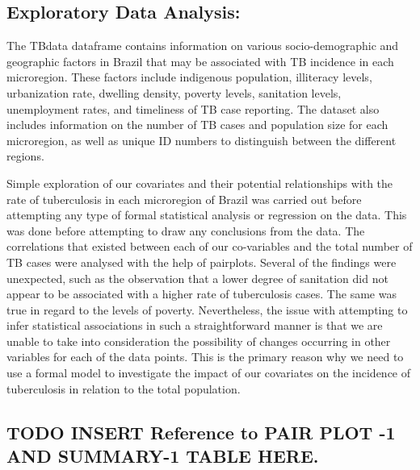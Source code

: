\documentclass[
  letterpaper,
  DIV=11,
  numbers=noendperiod]{scrartcl}
\begin{document}
\hypertarget{exploratory-data-analysis}{%
\subsection{Exploratory Data
Analysis:}\label{exploratory-data-analysis}}

The TBdata dataframe contains information on various socio-demographic
and geographic factors in Brazil that may be associated with TB
incidence in each microregion. These factors include indigenous
population, illiteracy levels, urbanization rate, dwelling density,
poverty levels, sanitation levels, unemployment rates, and timeliness of
TB case reporting. The dataset also includes information on the number
of TB cases and population size for each microregion, as well as unique
ID numbers to distinguish between the different regions.

Simple exploration of our covariates and their potential relationships
with the rate of tuberculosis in each microregion of Brazil was carried
out before attempting any type of formal statistical analysis or
regression on the data. This was done before attempting to draw any
conclusions from the data. The correlations that existed between each of
our co-variables and the total number of TB cases were analysed with the
help of pairplots. Several of the findings were unexpected, such as the
observation that a lower degree of sanitation did not appear to be
associated with a higher rate of tuberculosis cases. The same was true
in regard to the levels of poverty. Nevertheless, the issue with
attempting to infer statistical associations in such a straightforward
manner is that we are unable to take into consideration the possibility
of changes occurring in other variables for each of the data points.
This is the primary reason why we need to use a formal model to
investigate the impact of our covariates on the incidence of
tuberculosis in relation to the total population.

\hypertarget{todo-insert-reference-to-pair-plot--1-and-summary-1-table-here.}{%
\subsection{TODO INSERT Reference to PAIR PLOT -1 AND SUMMARY-1 TABLE
HERE.}\label{todo-insert-reference-to-pair-plot--1-and-summary-1-table-here.}}
\end{document}
